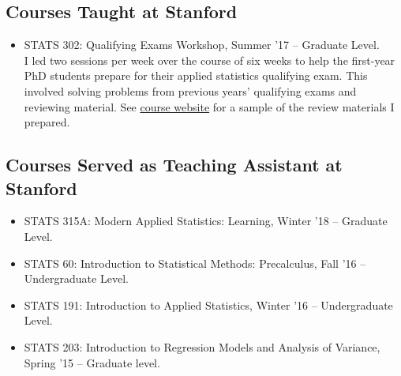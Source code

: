 \documentclass[letterpaper]{article}
\begin{document}
\subsection*{Courses Taught at Stanford}
\begin{itemize}\addtolength{\itemsep}{-0.2\baselineskip}
\item STATS 302: Qualifying Exams Workshop, Summer '17 -- Graduate Level. \\
I led two sessions per week over the course of six weeks to help the first-year PhD students prepare for their applied statistics qualifying exam. This involved solving problems from previous years' qualifying exams and reviewing material. See \href{http://web.stanford.edu/~ekatsevi/STATS302/}{course website} for a sample of the review materials I prepared.
\end{itemize}

\subsection*{Courses Served as Teaching Assistant at Stanford}
\begin{itemize}\addtolength{\itemsep}{-0.2\baselineskip}
\item STATS 315A: Modern Applied Statistics: Learning, Winter '18 -- Graduate Level.
\item STATS 60: Introduction to Statistical Methods: Precalculus, Fall '16 -- Undergraduate Level.
\item STATS 191: Introduction to Applied Statistics, Winter '16 -- Undergraduate Level.
\item STATS 203: Introduction to Regression Models and Analysis of Variance, Spring '15 -- Graduate level.
\end{itemize}
\end{document}
